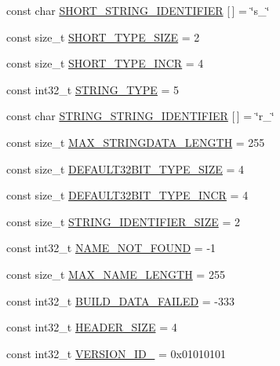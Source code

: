 \begin{DoxyCompactItemize}
const char \hyperlink{a00321_a5d6864069bd1e6c2850bee584b6246c8}{S\+H\+O\+R\+T\+\_\+\+S\+T\+R\+I\+N\+G\+\_\+\+I\+D\+E\+N\+T\+I\+F\+I\+E\+R} \mbox{[}$\,$\mbox{]} = \char`\"{}s\+\_\+\char`\"{}
\item 
const size\+\_\+t \hyperlink{a00321_a6807b39d59eed044eeefbd82c1fc9197}{S\+H\+O\+R\+T\+\_\+\+T\+Y\+P\+E\+\_\+\+S\+I\+Z\+E} = 2
\item 
const size\+\_\+t \hyperlink{a00321_a9aefe47f82372a9983eb5c00c14ac766}{S\+H\+O\+R\+T\+\_\+\+T\+Y\+P\+E\+\_\+\+I\+N\+C\+R} = 4
\item 
const int32\+\_\+t \hyperlink{a00321_aa7125477a4c5349f73b433334e9c4254}{S\+T\+R\+I\+N\+G\+\_\+\+T\+Y\+P\+E} = 5
\item 
const char \hyperlink{a00321_a3004646ddde8fc7d2ddf5402f50734f4}{S\+T\+R\+I\+N\+G\+\_\+\+S\+T\+R\+I\+N\+G\+\_\+\+I\+D\+E\+N\+T\+I\+F\+I\+E\+R} \mbox{[}$\,$\mbox{]} = \char`\"{}r\+\_\+\char`\"{}
\item 
const size\+\_\+t \hyperlink{a00321_a7c0e3fa427134810f5f7e12ae51c0e4e}{M\+A\+X\+\_\+\+S\+T\+R\+I\+N\+G\+D\+A\+T\+A\+\_\+\+L\+E\+N\+G\+T\+H} = 255
\item 
const size\+\_\+t \hyperlink{a00321_af40b7896c48bd8bb3ac060601e5e6945}{D\+E\+F\+A\+U\+L\+T32\+B\+I\+T\+\_\+\+T\+Y\+P\+E\+\_\+\+S\+I\+Z\+E} = 4
\item 
const size\+\_\+t \hyperlink{a00321_a6d7547242543558d67e96139a5627dd2}{D\+E\+F\+A\+U\+L\+T32\+B\+I\+T\+\_\+\+T\+Y\+P\+E\+\_\+\+I\+N\+C\+R} = 4
\item 
const size\+\_\+t \hyperlink{a00321_a11fc46547f00cbbe29b02b1ebd0f3dd0}{S\+T\+R\+I\+N\+G\+\_\+\+I\+D\+E\+N\+T\+I\+F\+I\+E\+R\+\_\+\+S\+I\+Z\+E} = 2
\item 
const int32\+\_\+t \hyperlink{a00321_a4af33563bfa9a20e489750090bb68329}{N\+A\+M\+E\+\_\+\+N\+O\+T\+\_\+\+F\+O\+U\+N\+D} = -\/1
\item 
const size\+\_\+t \hyperlink{a00321_a8cd7e74db8ce7ce5c4efdb9c5388742a}{M\+A\+X\+\_\+\+N\+A\+M\+E\+\_\+\+L\+E\+N\+G\+T\+H} = 255
\item 
const int32\+\_\+t \hyperlink{a00321_ab6190197be23431113a1f2b3f445ac9d}{B\+U\+I\+L\+D\+\_\+\+D\+A\+T\+A\+\_\+\+F\+A\+I\+L\+E\+D} = -\/333
\item 
const int32\+\_\+t \hyperlink{a00321_a4781240b7c5d7e82d07278fd9e6f7524}{H\+E\+A\+D\+E\+R\+\_\+\+S\+I\+Z\+E} = 4
\item 
const int32\+\_\+t \hyperlink{a00321_ae795429da33216b570397920343b8f05}{V\+E\+R\+S\+I\+O\+N\+\_\+\+I\+D\+\_} = 0x01010101
\end{DoxyCompactItemize}



